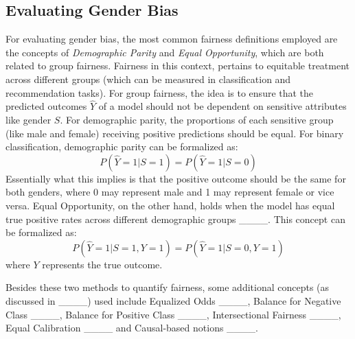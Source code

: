 \subsection{Evaluating Gender Bias}
\label{subsec:fair_notion}
For evaluating gender bias, the most common fairness definitions employed are the concepts of \textit{Demographic Parity} and \textit{Equal Opportunity}, which are both related to group fairness. Fairness in this context, pertains to equitable treatment across different groups (which can be measured in classification and recommendation tasks).
For group fairness, the idea is to ensure that the predicted outcomes  \(\hat{Y}\) of a model should not be dependent on sensitive attributes like gender $S$. 
For demographic parity, the proportions of each sensitive group (like male and female) receiving positive predictions should be equal. 
For binary classification, demographic parity can be formalized as: 
\[P(\hat{Y}=1 | S=1) = P(\hat{Y}=1 | S=0)\] 
Essentially what this implies is that the positive outcome should be the same for both genders, where 0 may represent male and 1 may represent female or vice versa. 
Equal Opportunity, on the other hand, holds when the model has equal true positive rates across different demographic groups ____. 
This concept can be formalized as:
\[P(\hat{Y}=1 | S=1, Y=1) = P(\hat{Y}=1 | S=0, Y=1) \]
where \(Y\) represents the true outcome.

Besides these two methods to quantify fairness, some additional concepts (as discussed in ____) used include Equalized Odds ____, Balance for Negative Class ____, Balance for Positive Class ____, Intersectional Fairness ____, Equal Calibration ____
and Causal-based notions ____. 




